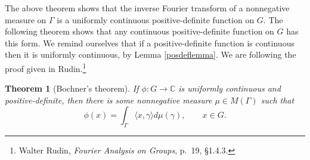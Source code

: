 \documentclass{article}
\newcommand{\inner}[2]{\langle #1, #2 \rangle}
\newtheorem{theorem}{Theorem}
\begin{document}
The above theorem shows that the inverse Fourier transform of a nonnegative measure on $\Gamma$ is a uniformly continuous positive-definite function
on $G$. The following theorem shows that any continuous positive-definite function on $G$ has this form. We remind ourselves
that if a positive-definite function is continuous then it is uniformly continuous, by
Lemma \ref{posdeflemma}. 
We are following the proof given in Rudin.\footnote{Walter Rudin, {\em Fourier Analysis on Groups}, p.~19, \S 1.4.3.}

\begin{theorem}[Bochner's theorem]
If $\phi:G \to \mathbb{C}$ is uniformly continuous and positive-definite, then there is some nonnegative measure $\mu \in M(\Gamma)$ such that
\[
\phi(x) = \int_\Gamma \inner{x}{\gamma} d\mu(\gamma), \qquad x \in G.
\]
\end{theorem}
\end{document}
